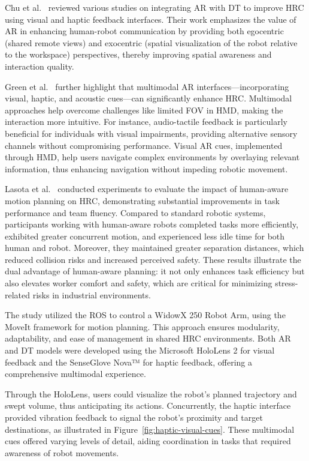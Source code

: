 Chu et al.~\cite{CHU2023313} reviewed various studies on integrating \ac{AR} with \ac{DT} to improve \ac{HRC} using visual and haptic feedback interfaces. Their work emphasizes the value of \ac{AR} in enhancing human-robot communication by providing both egocentric (shared remote views) and exocentric (spatial visualization of the robot relative to the workspace) perspectives, thereby improving spatial awareness and interaction quality. 

Green et al.~\cite{doi:10.5772/5664} further highlight that multimodal \ac{AR} interfaces—incorporating visual, haptic, and acoustic cues—can significantly enhance \ac{HRC}. Multimodal approaches help overcome challenges like limited \ac{FOV} in \ac{HMD}, making the interaction more intuitive. For instance, audio-tactile feedback is particularly beneficial for individuals with visual impairments, providing alternative sensory channels without compromising performance. Visual \ac{AR} cues, implemented through \ac{HMD}, help users navigate complex environments by overlaying relevant information, thus enhancing navigation without impeding robotic movement.

Lasota et al.~\cite{doi:10.1177/0018720814565188} conducted experiments to evaluate the impact of human-aware motion planning on \ac{HRC}, demonstrating substantial improvements in task performance and team fluency. Compared to standard robotic systems, participants working with human-aware robots completed tasks more efficiently, exhibited greater concurrent motion, and experienced less idle time for both human and robot. Moreover, they maintained greater separation distances, which reduced collision risks and increased perceived safety. These results illustrate the dual advantage of human-aware planning: it not only enhances task efficiency but also elevates worker comfort and safety, which are critical for minimizing stress-related risks in industrial environments.

The study utilized the \ac{ROS} to control a WidowX 250 Robot Arm, using the MoveIt framework for motion planning. This approach ensures modularity, adaptability, and ease of management in shared \ac{HRC} environments. Both \ac{AR} and \ac{DT} models were developed using the Microsoft HoloLens 2 for visual feedback and the SenseGlove Nova™ for haptic feedback, offering a comprehensive multimodal experience.

Through the HoloLens, users could visualize the robot's planned trajectory and swept volume, thus anticipating its actions. Concurrently, the haptic interface provided vibration feedback to signal the robot's proximity and target destinations, as illustrated in Figure~\ref{fig:haptic-visual-cues}. These multimodal cues offered varying levels of detail, aiding coordination in tasks that required awareness of robot movements.

